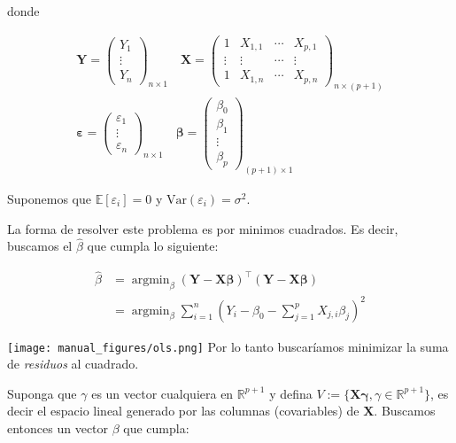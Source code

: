 \documentclass[
  12pt,
]{book}
\theoremstyle{definition}
\theoremstyle{definition}
\theoremstyle{definition}
\theoremstyle{definition}
\theoremstyle{remark}
\begin{document}
donde

\begin{multline*}
\boldsymbol{Y} = 
\begin{pmatrix}
Y_{1} \\
\vdots \\
Y_{n}
\end{pmatrix}_{n\times 1} 
\quad 
\boldsymbol{X} = 
\begin{pmatrix}
1 & X_{1,1} & \cdots & X_{p,1} \\
\vdots & \vdots & \cdots & \vdots\\
1 & X_{1,n}& \cdots & X_{p,n}
\end{pmatrix}_{n\times (p+1)}
\\
\boldsymbol{\varepsilon} = 
\begin{pmatrix}
\varepsilon_{1} \\
\vdots \\
\varepsilon_{n}
\end{pmatrix}_{n\times 1} 
\quad 
\boldsymbol{\beta} = 
\begin{pmatrix}
\beta_{0} \\
\beta_{1} \\
\vdots \\
\beta_{p}
\end{pmatrix}_{(p+1)\times 1} 
\end{multline*}

Suponemos que \(\mathbb{E}\left[\varepsilon_{i}\right] = 0\) y \(\mathrm{Var}\left(\varepsilon_{i}\right) = \sigma^{2}\).

La forma de resolver este problema es por minimos cuadrados. Es decir, buscamos el \(\hat{\beta}\) que cumpla lo siguiente:

\begin{align}
\hat{\beta} &= 
 \operatorname{argmin}_\beta (\boldsymbol{Y} - \boldsymbol{X} \boldsymbol{\beta})^{\top} (\boldsymbol{Y} - \boldsymbol{X} \boldsymbol{\beta})\\
 &=  \operatorname{argmin}_\beta \sum_{i=1}^n \left( Y_{i} -\beta_{0} - \sum_{j=1}^p X_{j,i} \beta_{j} \right)^2 
 \label{eq:minimos-cuadrados}
 \end{align}

\texttt{[image: manual\_figures/ols.png]}
Por lo tanto buscaríamos minimizar la suma de \emph{residuos} al cuadrado.

Suponga que \(\gamma\) es un vector cualquiera en \(\mathbb{R}^{p+1}\) y defina \(V := \{\boldsymbol{X}\boldsymbol{\gamma}, \gamma \in \mathbb{R}^{p+1}\}\), es decir el espacio lineal generado por las columnas (covariables) de \(\boldsymbol{X}\). Buscamos entonces un vector \(\beta\) que cumpla:
\end{document}
